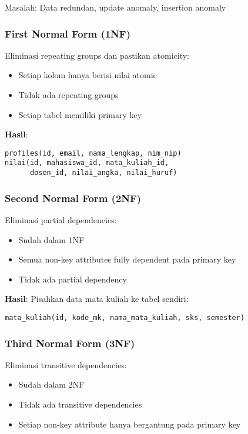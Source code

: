 \documentclass[12pt,a4paper]{article}
\begin{document}
Masalah: Data redundan, update anomaly, insertion anomaly

\subsubsection{First Normal Form (1NF)}

Eliminasi repeating groups dan pastikan atomicity:

\begin{itemize}
    \item Setiap kolom hanya berisi nilai atomic
    \item Tidak ada repeating groups
    \item Setiap tabel memiliki primary key
\end{itemize}

\textbf{Hasil}:
\begin{verbatim}
profiles(id, email, nama_lengkap, nim_nip)
nilai(id, mahasiswa_id, mata_kuliah_id, 
      dosen_id, nilai_angka, nilai_huruf)
\end{verbatim}

\subsubsection{Second Normal Form (2NF)}

Eliminasi partial dependencies:

\begin{itemize}
    \item Sudah dalam 1NF
    \item Semua non-key attributes fully dependent pada primary key
    \item Tidak ada partial dependency
\end{itemize}

\textbf{Hasil}: Pisahkan data mata kuliah ke tabel sendiri:
\begin{verbatim}
mata_kuliah(id, kode_mk, nama_mata_kuliah, sks, semester)
\end{verbatim}

\subsubsection{Third Normal Form (3NF)}

Eliminasi transitive dependencies:

\begin{itemize}
    \item Sudah dalam 2NF
    \item Tidak ada transitive dependencies
    \item Setiap non-key attribute hanya bergantung pada primary key
\end{itemize}
\end{document}
